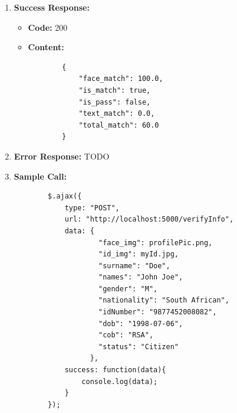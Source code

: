 \documentclass{article}
\begin{document}
\begin{enumerate}
        	\item \textbf{Success Response:} 
        		\begin{itemize}
        			\item \textbf{Code:} 200
        			\item \textbf{Content:}
        			\begin{lstlisting}
        {
            "face_match": 100.0, 
            "is_match": true, 
            "is_pass": false, 
            "text_match": 0.0, 
            "total_match": 60.0
        }
        			\end{lstlisting}
        		\end{itemize}
        		\item \textbf{Error Response:} TODO
        		\item \textbf{Sample Call:}
        		\begin{lstlisting}
        $.ajax({
            type: "POST",
            url: "http://localhost:5000/verifyInfo",
            data: {
                    "face_img": profilePic.png,
                    "id_img": myId.jpg,
                    "surname": "Doe",
                    "names": "John Joe",
                    "gender": "M",
                    "nationality": "South African",
                    "idNumber": "9877452008082",
                    "dob": "1998-07-06",
                    "cob": "RSA",
                    "status": "Citizen"
                  },
            success: function(data){
                console.log(data);
            }
        });
        		\end{lstlisting}
        \end{enumerate}
\end{document}
